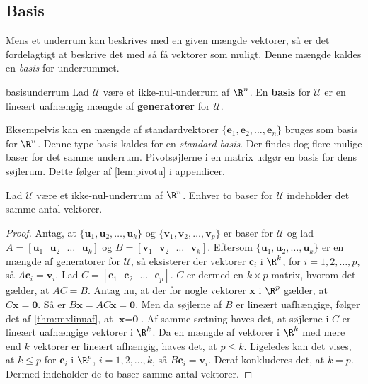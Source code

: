 \subsection{Basis}
Mens et underrum kan beskrives med en given mængde vektorer, så er det fordelagtigt at beskrive det med så få vektorer som muligt. 
Denne mængde kaldes en \textit{basis} for underrummet.
%
\begin{defn}{}{basisunderrum}
Lad $\mathcal{U}$ være et ikke-nul-underrum af $\R^n$. 
En \textbf{basis} for $\mathcal{U}$ er en lineært uafhængig mængde af \textbf{generatorer} for $\mathcal{U}$.
\end{defn}
\noindent
Eksempelvis kan en mængde af standardvektorer $\{\textbf{e}_1,\textbf{e}_2,\ldots,\textbf{e}_n\}$ bruges som basis for $\R^n$.
Denne type basis kaldes for en \textit{standard basis}.
Der findes dog flere mulige baser for det samme underrum.
%
Pivotsøjlerne i en matrix udgør en basis for dens søjlerum.
Dette følger af \ref{lem:pivotu} i appendicer.
%
\begin{thm}{}{}
Lad $\mathcal{U}$ være et ikke-nul-underrum af $\R^n$. Enhver to baser for $\mathcal{U}$ indeholder det samme antal vektorer.
\end{thm}
\begin{proof}
Antag, at $\{\textbf{u}_1,\textbf{u}_2,\ldots,\textbf{u}_k\} $ og $\{\textbf{v}_1,\textbf{v}_2,\ldots,\textbf{v}_p\} $ er baser for $\mathcal{U}$ og lad $A=[\textbf{u}_1 \text{ } \textbf{u}_2 \text{ }  \ldots \text{ } \textbf{u}_k] $ og $B=[\textbf{v}_1 \text{ } \textbf{v}_2 \text{ }  \ldots \text{ } \textbf{v}_k] $.
Eftersom $\{\textbf{u}_1,\textbf{u}_2,\ldots,\textbf{u}_k\} $ er en mængde af generatorer for $\mathcal{U}$, så eksisterer der vektorer $\textbf{c}_i$ i $\R^k$, for $i=1,2,\ldots,p$, så $A\textbf{c}_i=\textbf{v}_i$.
Lad $C=[\textbf{c}_1 \text{ } \textbf{c}_2 \text{ } \ldots \text{ } \textbf{c}_p]$.
$C$ er dermed en $ k \times p$ matrix, hvorom det gælder, at $AC=B$.
Antag nu, at der for nogle vektorer $\textbf{x}$ i $\R^p$ gælder, at $C\textbf{x}=\textbf{0}$. 
Så er $B\textbf{x}=AC\textbf{x}=\textbf{0}$. 
Men da søjlerne af $B$ er lineært uafhængige, følger det af \ref{thm:mxlinuaf}, at $\textbf{x}=\textbf{0}$.
Af samme sætning haves det, at søjlerne i $C$ er lineært uafhængige vektorer i $\R^k$.
Da en mængde af vektorer i $\R^k$ med mere end $k$ vektorer er lineært afhængig, haves det, at $p\leq k$. 
Ligeledes kan det vises, at $k \leq p$ for $\textbf{c}_i$ i $\R^p$, $i=1,2,\ldots,k$, så $B\textbf{c}_i=\textbf{v}_i$. 
Deraf konkluderes det, at $k=p$.
Dermed indeholder de to baser samme antal vektorer. 
\end{proof}